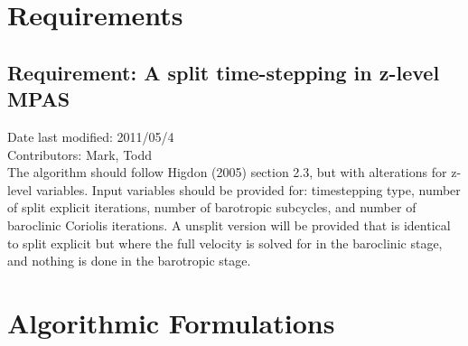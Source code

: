 \documentclass[11pt]{report}
\begin{document}

\chapter{Requirements}

\section{Requirement: A split time-stepping in z-level MPAS}
Date last modified: 2011/05/4 \\
Contributors: Mark, Todd \\

The algorithm should follow Higdon (2005) section 2.3, but with alterations for z-level variables.
Input variables should be provided for: timestepping type, number of split explicit iterations, number of barotropic subcycles, and number of baroclinic Coriolis iterations.
A unsplit version will be provided that is identical to split explicit but where the full velocity is solved for in the baroclinic stage, and nothing is done in the barotropic stage.




\chapter{Algorithmic Formulations}

\end{document}
